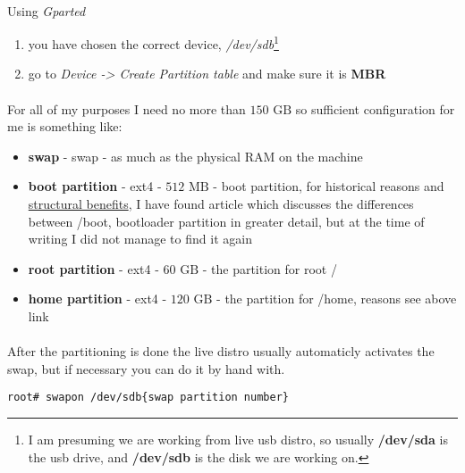 \documentclass[10pt,a4paper]{article}
\begin{document}
                \paragraph{} Using \textit{Gparted}\begin{enumerate}
                    \item you have chosen the correct device, \textit{/dev/sdb}\footnote{ I am presuming we are working from live usb distro, so usually \textbf{/dev/sda} is the usb drive, and \textbf{/dev/sdb} is the disk we are working on.}
                    \item go to \textit{Device -> Create Partition table} and make sure it is \textbf{MBR}
                \end{enumerate}

                \paragraph{} For all of my purposes I need no more than $ 150 \mbox{ GB}$ so sufficient configuration for me is something like: \begin{itemize}
                    \item \textbf{swap} - swap - as much as the physical RAM on the machine
                    \item \textbf{boot partition} - ext4 - $ 512 \mbox{ MB} $  - boot partition, for historical reasons and \href{https://superuser.com/questions/522971/is-a-boot-partition-always-necessary}{structural benefits}, I have found article which discusses the differences between /boot, bootloader partition in greater detail, but at the time of writing I did not manage to find it again
                    \item \textbf{root partition} - ext4 - $ 60 \mbox{ GB} $ - the partition for root /
                    \item \textbf{home partition} - ext4 - $ 120 \mbox{ GB} $ - the partition for /home, reasons see above link
                \end{itemize}

                \paragraph{} After the partitioning is done the live distro usually automaticly activates the swap, but if necessary you can do it by hand with.

\begin{lstlisting}[style=BashInputRoot]
root# swapon /dev/sdb{swap partition number}
\end{lstlisting}
\end{document}
